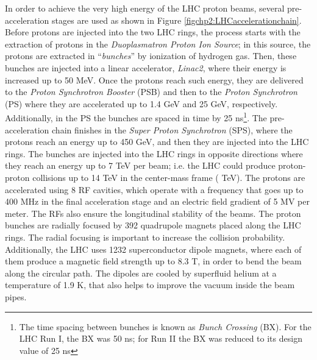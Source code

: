 In order to achieve the very high energy of the LHC proton beams, several
pre-acceleration stages are used as shown in Figure \ref{figchp2:LHCaccelerationchain}. Before 
protons are injected into the two LHC rings, the process starts 
with the extraction of protons in the \textit{Duoplasmatron 
Proton Ion Source}; in this source, the protons are extracted in ``\textit{bunches}'' 
by ionization of hydrogen gas. Then, these bunches are 
injected into a linear accelerator, \textit{Linac2}, where 
their energy is increased up to 50 MeV. Once the protons 
reach such energy, they are delivered to the 
\textit{Proton Synchrotron Booster} (PSB) and then to the \textit{Proton Synchrotron} (PS) 
where they are accelerated up to 1.4 GeV and 25 GeV, respectively. Additionally,
in the PS the bunches are spaced in time by 25 ns\footnote{The time spacing between 
bunches is known as \textit{Bunch Crossing} (BX). For the LHC Run I, the BX was 50 ns; for Run II 
the BX was reduced to its design value of 25 ns}. The pre-acceleration chain 
finishes in the \textit{Super Proton Synchrotron} (SPS), where the protons reach 
an energy up to 450 GeV, and then they are injected into the LHC rings. The bunches are 
injected into the LHC rings in opposite directions where they reach an 
energy up to 7 TeV per beam; i.e. the LHC could produce proton-proton collisions 
up to 14 TeV in the center-mass frame ( TeV). The protons are accelerated 
using 8 RF cavities, which operate with a frequency 
that goes up to 400 MHz in the final acceleration stage and an electric field 
gradient of 5 MV per meter. The RFs also ensure the longitudinal stability of the beams. The 
proton bunches are radially focused by 392 quadrupole magnets placed along the 
LHC rings. The radial focusing is important to increase the collision probability. Additionally, the 
LHC uses 1232 superconductor dipole magnets, where each of them produce a magnetic field strength 
up to 8.3 T, in order to bend the beam along the circular path. The dipoles 
are cooled by superfluid helium at a temperature of 1.9 K, that also helps to improve the vacuum
inside the beam pipes. 

